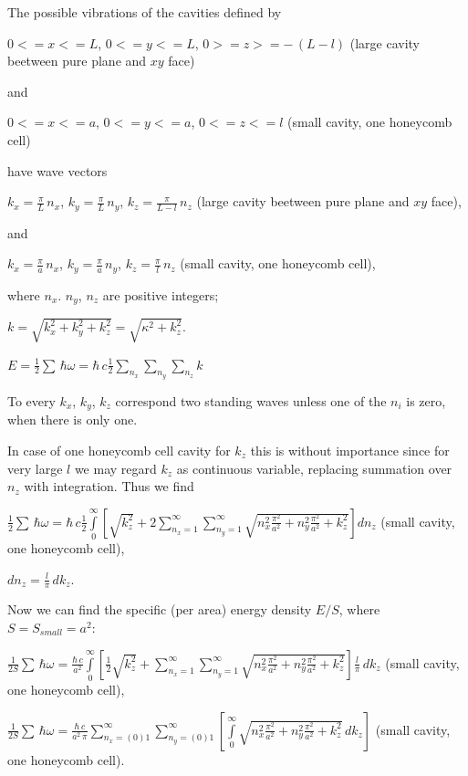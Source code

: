 \documentclass[11pt]{article}
\begin{document}
    The possible vibrations of the cavities defined by

\(0<=x<=L\), \(0<=y<=L\), \(0>=z>=-\,(L-l)\) (large cavity beetween pure
plane and \(xy\) face)

and

\(0<=x<=a\), \(0<=y<=a\), \(0<=z<=l\) (small cavity, one honeycomb cell)

    have wave vectors

\(k_x = \frac{\pi}{L}\,n_x\), \(k_y = \frac{\pi}{L}\,n_y\),
\(k_z = \frac{\pi}{L-l}\,n_z\) (large cavity beetween pure plane and
\(xy\) face),

and

\(k_x = \frac{\pi}{a}\,n_x\), \(k_y = \frac{\pi}{a}\,n_y\),
\(k_z = \frac{\pi}{l}\,n_z\) (small cavity, one honeycomb cell),

where \(n_x\). \(n_y\), \(n_z\) are positive integers;

\(k = \sqrt{k_x^2+k_y^2+k_z^2} = \sqrt{\kappa^2+k_z^2}\).

\(E = \frac{1}{2}\sum\,\hbar\omega = \hbar\,c\frac{1}{2}\sum\limits_{n_x}^{}\sum\limits_{n_y}^{}\sum\limits_{n_z}^{}k\)

    To every \(k_x\), \(k_y\), \(k_z\) correspond two standing waves unless
one of the \(n_i\) is zero, when there is only one.

In case of one honeycomb cell cavity for \(k_z\) this is without
importance since for very large \(l\) we may regard \(k_z\) as
continuous variable, replacing summation over \(n_z\) with integration.
Thus we find

\(\frac{1}{2}\sum\,\hbar\omega = \hbar\,c\frac{1}{2}\int\limits_{0}^{\infty}\left[{\sqrt{k_z^2}+2\sum\limits_{n_x=1}^{\infty}\sum\limits_{n_y=1}^{\infty}\sqrt{n_x^2\frac{\pi^2}{a^2}+n_y^2\frac{\pi^2}{a^2}+k_z^2}}\right]d{n_z}\)
(small cavity, one honeycomb cell),

\(dn_z = \frac{l}{\pi}\,dk_z\).

    Now we can find the specific (per area) energy density \(E/S\), where
\(S = S_{small} = a^2\):

    \(\frac{1}{2 S}\sum\,\hbar\omega = \frac{\hbar\,c}{a^2}\int\limits_{0}^{\infty}\left[{\frac{1}{2}\sqrt{k_z^2}+\sum\limits_{n_x=1}^{\infty}\sum\limits_{n_y=1}^{\infty}\sqrt{n_x^2\frac{\pi^2}{a^2}+n_y^2\frac{\pi^2}{a^2}+k_z^2}}\right]\frac{l}{\pi}\,dk_z\)
(small cavity, one honeycomb cell),

    \(\frac{1}{2 S}\sum\,\hbar\omega = \frac{\hbar\,c}{a^2\,\pi}\sum\limits_{n_x=(0)1}^{\infty}\sum\limits_{n_y=(0)1}^{\infty}\left[\int\limits_{0}^{\infty}\sqrt{n_x^2\frac{\pi^2}{a^2}+n_y^2\frac{\pi^2}{a^2}+k_z^2}\,dk_z\right]\)
(small cavity, one honeycomb cell).
\end{document}
